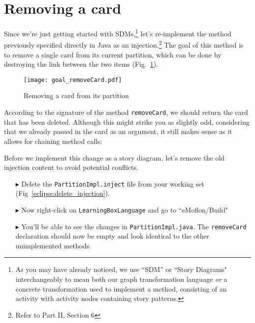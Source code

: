 \newpage
\genHeader
\section{Removing a card}
\hypertarget{sec:remCard}{}

Since we're just getting started with SDMs,\footnote{As you may have already noticed, we use ``SDM'' or ``Story Diagrams" interchangeably to mean both our graph
transformation language \emph{or} a concrete transformation used to implement a method, consisting of an activity with activity nodes containing story
patterns.} let's re-implement the method previously specified directly in Java as an injection.\footnote{Refer to Part II, Section 6} The goal of this method
is to remove a single card from its current partition, which can be done by destroying the link between the two items (Fig.~\ref{fig:goal_removeCard}).

\vspace{1cm}

\begin{figure}[htbp]
	\centering
    \texttt{[image: goal\_removeCard.pdf]}
	\caption{Removing a card from its partition}
	\label{fig:goal_removeCard}
\end{figure}
\FloatBarrier

\vspace{0.5cm}

According to the signature of the method \texttt{removeCard}, we should return the card that has been deleted. Although this might strike you as slightly odd,
considering that we already passed in the card as an argument, it still makes sense as it allows for chaining method calls:

Before we implement this change as a story diagram, let's remove the old injection content to avoid potential conflicts.

\begin{itemize}

\item[$\blacktriangleright$] Delete the \texttt{PartitionImpl.inject} file from your working set (Fig~\ref{eclipse:delete_injection}).

\item[$\blacktriangleright$] Now right-click on \texttt{LearningBoxLanguage} and go to ``eMoflon/Build" 

\item[$\blacktriangleright$] You'll be able to see the changes in \texttt{PartitionImpl.java}. The \texttt{removeCard}
declaration should now be empty and look identical to the other unimplemented methods.

\end{itemize}

